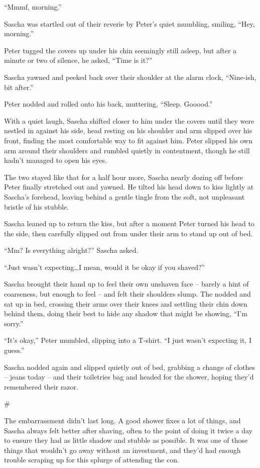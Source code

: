 \documentclass[12pt,letterpaper,oneside]{memoir}
\newcommand\secdiv{
  \begin{center}
    \#
  \end{center}
}
\begin{document}
  ``Mmmf, morning.''

  Sascha was startled out of their reverie by Peter's quiet mumbling, smiling, ``Hey, morning.''

  Peter tugged the covers up under his chin seemingly still asleep, but after a minute or two of silence, he asked, ``Time is it?''

  Sascha yawned and peeked back over their shoulder at the alarm clock, ``Nine-ish, bit after.''

  Peter nodded and rolled onto his back, muttering, ``Sleep. Gooood.''

  With a quiet laugh, Sascha shifted closer to him under the covers until they were nestled in against his side, head resting on his shoulder and arm slipped over his front, finding the most comfortable way to fit against him. Peter slipped his own arm around their shoulders and rumbled quietly in contentment, though he still hadn't managed to open his eyes.

  The two stayed like that for a half hour more, Sascha nearly dozing off before Peter finally stretched out and yawned. He tilted his head down to kiss lightly at Sascha's forehead, leaving behind a gentle tingle from the soft, not unpleasant bristle of his stubble.

  Sascha leaned up to return the kiss, but after a moment Peter turned his head to the side, then carefully slipped out from under their arm to stand up out of bed.

  ``Mm? Is everything alright?'' Sascha asked.

  ``Just wasn't expecting\ldots{}I mean, would it be okay if you shaved?''

  Sascha brought their hand up to feel their own unshaven face -- barely a hint of coarseness, but enough to feel -- and felt their shoulders slump. The nodded and sat up in bed, crossing their arms over their knees and settling their chin down behind them, doing their best to hide any shadow that might be showing, ``I'm sorry.''

  ``It's okay,'' Peter mumbled, slipping into a T-shirt. ``I just wasn't expecting it, I guess.''

  Sascha nodded again and slipped quietly out of bed, grabbing a change of clothes -- jeans today -- and their toiletries bag and headed for the shower, hoping they'd remembered their razor.

  \secdiv

  The embarrassment didn't last long. A good shower fixes a lot of things, and Sascha always felt better after shaving, often to the point of doing it twice a day to ensure they had as little shadow and stubble as possible. It was one of those things that wouldn't go away without an investment, and they'd had enough trouble scraping up for this splurge of attending the con.
\end{document}
